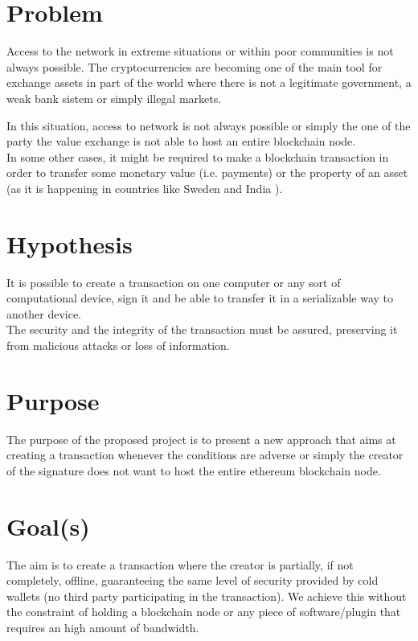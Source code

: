 \documentclass[paper=a4, fontsize=11pt]{scrartcl} %
\numberwithin{equation}{section} %
\numberwithin{figure}{section} %
\numberwithin{table}{section} %
\begin{document}
\section{Problem}

Access to the network in extreme situations or within poor communities is not always possible. The cryptocurrencies are becoming one of the main tool for exchange assets in part of the world where there is not a legitimate government, a weak bank sistem or simply illegal markets.

In this situation, access to network is not always possible or simply the one of the party the value exchange is not able to host an entire blockchain node. \\

In some other cases, it might be required to make a blockchain transaction in order to transfer some monetary value (i.e. payments) or the property of an asset (as it is happening in countries like Sweden and India \cite{sweden2017}).

\section{Hypothesis}
It is possible to create a transaction on one computer or any sort of computational device, sign it and be able to transfer it in a serializable way to another device. \\

The security and the integrity of the transaction must be assured, preserving it from malicious attacks or loss of information.

\section{Purpose}

The purpose of the proposed project is to present a new approach that aims at creating a transaction whenever the conditions are adverse or simply the creator of the signature does not want to host the entire ethereum blockchain node.


\section{Goal(s)}

The aim is to create a transaction where the creator is partially, if not completely, offline, guaranteeing the same level of security provided by cold wallets (no third party participating in the transaction). We achieve this without the constraint of holding a blockchain node or any piece of software/plugin that requires an high amount of bandwidth.
\end{document}
